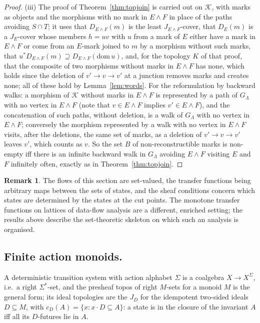 \documentclass[11pt]{amsart}
\theoremstyle{definition}
\newtheorem{rem}[thm]{Remark}
\begin{document}
\begin{proof}
(iii) The proof of Theorem~\ref{thm:topjoin} is carried out on $\mathcal
K$, with marks as objects and the morphisms with no mark in $E\wedge F$
in place of the paths avoiding $S\cap T$; it uses that $D_{E\wedge F}(m)$
is the least $J_{E\wedge F}$-cover, that $D_E(m)$ is a $J_E$-cover whose
members $h=uv$ with $u$ from a mark of $E$ either have a mark in $E\wedge
F$ or come from an $E$-mark joined to $m$ by a morphism without such
marks, that $u^*D_{E\wedge F}(m)\supseteq D_{E\wedge F}(\mathrm{dom}\,u)$,
and, for the topology $K$ of that proof, that the composite of two
morphisms without marks in $E\wedge F$ has none, which holds since the
deletion of $v'\to v\to v'$ at a junction removes marks and creates
none; all of these hold by Lemma~\ref{lem:words}. For the reformulation
by backward walks: a morphism of $\mathcal K$ without marks in $E\wedge
F$ is represented by a path of $G_\Lambda$ with no vertex in $E\wedge F$
(note that $v\in E\wedge F$ implies $v'\in E\wedge F$), and the
concatenation of such paths, without deletion, is a walk of
$G_\Lambda$ with no vertex in $E\wedge F$; conversely the morphism
represented by a walk with no vertex in $E\wedge F$ visits, after the
deletions, the same set of marks, as a deletion of $v'\to v\to v'$
leaves $v'$, which counts as $v$. So the set $B$ of non-reconstructible
marks is non-empty iff there is an infinite backward walk in
$G_\Lambda$ avoiding $E\wedge F$ visiting $E$ and $F$ infinitely often,
exactly as in Theorem~\ref{thm:topjoin}.
\end{proof}

\begin{rem}
The flows of this section are set-valued, the transfer functions being
arbitrary maps between the sets of states, and the sheaf conditions
concern which states are determined by the states at the cut points.
The monotone transfer functions on lattices of data-flow analysis are
a different, enriched setting; the results above describe the
set-theoretic skeleton on which such an analysis is organised.
\end{rem}

\subsection{Finite action monoids.}
A deterministic transition system with action alphabet $\Sigma$ is a
coalgebra $X\to X^\Sigma$, i.e.\ a right $\Sigma^*$-set, and the presheaf
topos of right $M$-sets for a monoid $M$ is the general form; its ideal
topologies are the $J_D$ for the idempotent two-sided ideals $D\subseteq
M$, with $c_D(A)=\{x:x\cdot D\subseteq A\}$: a state is in the closure of
the invariant $A$ iff all its $D$-futures lie in $A$.
\end{document}
